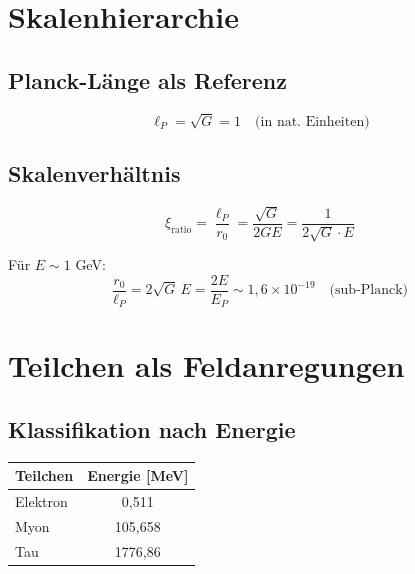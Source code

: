 	\section{Skalenhierarchie}
	\label{sec:scale_hierarchy}
	
	\subsection{Planck-Länge als Referenz}
	
	\begin{equation}
		\ell_P = \sqrt{G} = 1 \quad \text{(in nat. Einheiten)}
	\end{equation}
	
	\subsection{Skalenverhältnis}
	
	\begin{equation}
		\xi_{\text{ratio}} = \frac{\ell_P}{r_0} = \frac{\sqrt{G}}{2GE} = \frac{1}{2\sqrt{G} \cdot E}
	\end{equation}
	
	Für $E \sim 1$ GeV:
	\begin{equation}
		\frac{r_0}{\ell_P} = 2\sqrt{G}\,E = \frac{2E}{E_P} \sim 1{,}6\times10^{-19} \quad \text{(sub-Planck)}
	\end{equation}
	
	\section{Teilchen als Feldanregungen}
	\label{sec:particles}
	
	\subsection{Klassifikation nach Energie}
	
	\begin{table}[h]
		\centering
		\begin{tabular}{lc}
			\hline
			\textbf{Teilchen} & \textbf{Energie [MeV]} \\
			\hline
			Elektron & 0,511 \\
			Myon & 105,658 \\
			Tau & 1776,86 \\
			\hline
		\end{tabular}
	\end{table}
	
